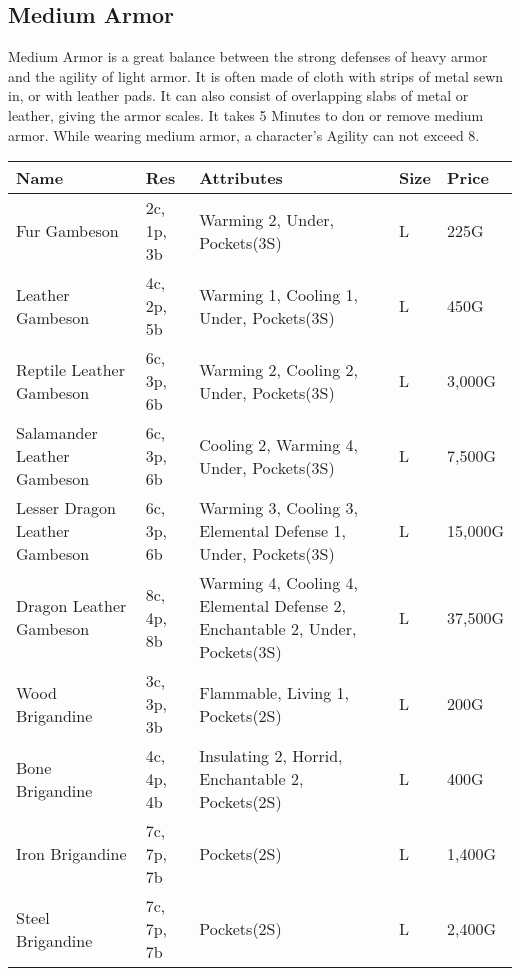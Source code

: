\subsection{Medium Armor}\label{subsec:mediumArmor}
Medium Armor is a great balance between the strong defenses of heavy armor and the agility of light armor.
It is often made of cloth with strips of metal sewn in, or with leather pads.
It can also consist of overlapping slabs of metal or leather, giving the armor scales.
It takes 5 Minutes to don or remove medium armor.
While wearing medium armor, a character's Agility can not exceed 8.

\begin{longtable}{p{3.5cm} | p{1.5cm} | p{5cm} | p{1cm} | p{1.25cm}}
	Name & Res & Attributes & Size & Price\\ \hline
	
	Fur Gambeson & 2c, 1p, 3b & Warming 2, Under, Pockets(3S) & L & 225G\\
	
	Leather Gambeson & 4c, 2p, 5b & Warming 1, Cooling 1, Under, Pockets(3S) & L & 450G\\
	
	Reptile Leather Gambeson & 6c, 3p, 6b & Warming 2, Cooling 2, Under, Pockets(3S) & L & 3,000G\\
	
	Salamander Leather Gambeson & 6c, 3p, 6b & Cooling 2, Warming 4, Under, Pockets(3S) & L & 7,500G\\
	
	Lesser Dragon Leather Gambeson & 6c, 3p, 6b & Warming 3, Cooling 3, Elemental Defense 1, Under, Pockets(3S) & L & 15,000G\\
	
	Dragon Leather Gambeson & 8c, 4p, 8b & Warming 4, Cooling 4, Elemental Defense 2, Enchantable 2, Under, Pockets(3S) & L & 37,500G\\
	
	Wood Brigandine & 3c, 3p, 3b & Flammable, Living 1, Pockets(2S) & L & 200G\\
	
	Bone Brigandine & 4c, 4p, 4b & Insulating 2, Horrid, Enchantable 2, Pockets(2S) & L & 400G\\
	
	Iron Brigandine & 7c, 7p, 7b & Pockets(2S) & L & 1,400G\\
	
	Steel Brigandine & 7c, 7p, 7b & Pockets(2S) & L & 2,400G\\
	

\end{longtable}
